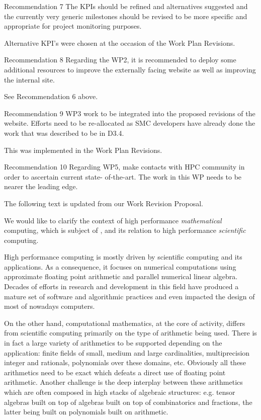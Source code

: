 \begin{recommendation}{Recommendation 7}
  The KPIs should be refined and alternatives suggested and the
  currently very generic milestones should be revised to be more
  specific and appropriate for project monitoring purposes.
\end{recommendation}

Alternative KPI's were chosen at the occasion of the Work Plan
Revisions.

\begin{recommendation}{Recommendation 8}
  Regarding the WP2, it is recommended to deploy some additional
  resources to improve the externally facing website as well as
  improving the internal site.
\end{recommendation}

See Recommendation 6 above.

\begin{recommendation}{Recommendation 9}
  WP3 work to be integrated into the proposed revisions of the
  website. Efforts need to be re-allocated as SMC developers have
  already done the work that was described to be in D3.4.
\end{recommendation}

This was implemented in the Work Plan Revisions.

\begin{recommendation}{Recommendation 10}
  Regarding WP5, make contacts with HPC community in order to
  ascertain current state- of-the-art. The work in this WP needs to be
  nearer the leading edge.
\end{recommendation}

The following text is updated from our Work Revision Proposal.

We would like to clarify the context of high performance \emph{mathematical} computing,
which is subject of , and its relation to high
performance \emph{scientific} computing.

High performance computing is mostly driven by scientific computing and its
applications. As a consequence, it focuses on numerical computations using
approximate floating point arithmetic and parallel numerical linear algebra. Decades of
efforts in research and development in this field have produced a mature  set of
software and algorithmic practices and even impacted the design of most of nowadays computers.

On the other hand, computational mathematics, at the core of \ODK activity, differs from scientific
computing primarily on the type of arithmetic being used. There is in fact a
large variety of arithmetics to be supported depending on the application: finite
  fields of small, medium and large cardinalities, multiprecision integer and
  rationals, polynomials over these domains, etc. Obviously all these
  arithmetics need to be exact which defeats a direct use of floating point
  arithmetic. Another challenge is the deep interplay between these arithmetics
  which are often composed in high stacks of algebraic structures: e.g. tensor
  algebras built on top of algebras built on top of combinatorics and
  fractions, the latter being built on polynomials built on arithmetic.

